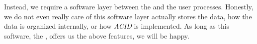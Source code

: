 Instead, we require a software layer between the  and the user processes.
Honestly, we do not even really care of this software layer actually stores the data, how the data is organized internally, or how \emph{ACID} is implemented.
As long as this software, the , offers us the above features, we will be happy.%
\endhsection%
\endhsection%
%
